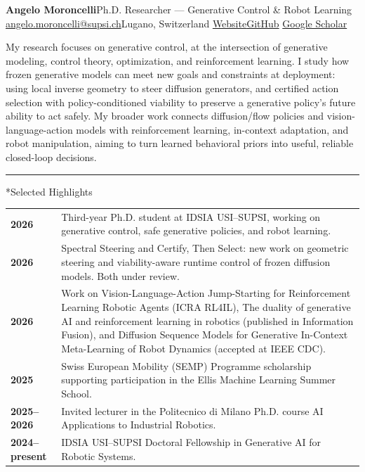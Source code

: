 \documentclass[10pt,a4paper]{article}
\makeatletter
\renewcommand{\section}{\@ifstar\cvsection\cvsection}
\newcommand{\cvsection}[1]{\par\addvspace{9pt}{\large\bfseries #1\par}\nobreak\vspace{4pt}\hrule\nobreak\vspace{5pt}}
\makeatother
\begin{document}
{\LARGE\bfseries Angelo Moroncelli}\hfill{\small Ph.D. Researcher — Generative Control \& Robot Learning}\\[3pt]
\href{mailto:angelo.moroncelli@supsi.ch}{angelo.moroncelli@supsi.ch}\quad Lugano, Switzerland\quad
\href{https://clmoro.github.io}{Website}\quad\href{https://github.com/clmoro}{GitHub}\quad
\href{https://scholar.google.com/citations?user=3u1DpR4AAAAJ}{Google Scholar}

My research focuses on generative control, at the intersection of generative modeling, control theory, optimization, and reinforcement learning. I study how frozen generative models can meet new goals and constraints at deployment: using local inverse geometry to steer diffusion generators, and certified action selection with policy-conditioned viability to preserve a generative policy's future ability to act safely. My broader work connects diffusion/flow policies and vision-language-action models with reinforcement learning, in-context adaptation, and robot manipulation, aiming to turn learned behavioral priors into useful, reliable closed-loop decisions.
\section*{Selected Highlights}
\begin{tabularx}{\textwidth}{@{}p{}@{\hspace{8pt}}X@{}}
\textbf{2026} & Third-year Ph.D. student at IDSIA USI–SUPSI, working on generative control, safe generative policies, and robot learning.\\[4pt]
\textbf{2026} & Spectral Steering and Certify, Then Select: new work on geometric steering and viability-aware runtime control of frozen diffusion models. Both under review.\\[4pt]
\textbf{2026} & Work on Vision-Language-Action Jump-Starting for Reinforcement Learning Robotic Agents (ICRA RL4IL), The duality of generative AI and reinforcement learning in robotics (published in Information Fusion), and Diffusion Sequence Models for Generative In-Context Meta-Learning of Robot Dynamics (accepted at IEEE CDC).\\[4pt]
\textbf{2025} & Swiss European Mobility (SEMP) Programme scholarship supporting participation in the Ellis Machine Learning Summer School.\\[4pt]
\textbf{2025–2026} & Invited lecturer in the Politecnico di Milano Ph.D. course AI Applications to Industrial Robotics.\\[4pt]
\textbf{2024–present} & IDSIA USI–SUPSI Doctoral Fellowship in Generative AI for Robotic Systems.
\end{tabularx}
\end{document}
